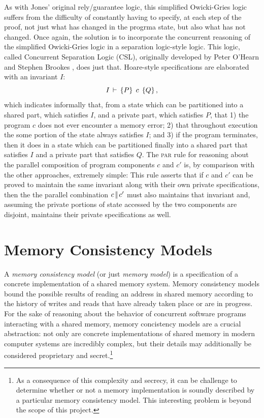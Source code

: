 \documentclass[11pt]{report}
\begin{document}
As with Jones' original rely/guarantee logic, this simplified Owicki-Gries logic suffers from the difficulty of constantly having to specify, at each step of the proof, not just what has changed in the progrma state, but also what has not changed. Once again, the solution is to incorporate the concurrent reasoning of the simplified Owicki-Gries logic in a separation logic-style logic. This logic, called Concurrent Separation Logic (CSL), originally developed by Peter O'Hearn and Stephen Brookes \cite{DBLP:journals/tcs/OHearn07,DBLP:journals/tcs/Brookes07}, does just that. Hoare-style specifications are elaborated with an invariant $I$: \[ I\,\vdash\,\left\lbrace P \right\rbrace\;c\;\left\lbrace Q \right\rbrace,\] which indicates informally that, from a state which can be partitioned into a shared part, which satisfies $I$, and a private part, which satisfies $P$, that 1) the program $c$ does not ever encounter a memory error; 2) that throughout execution the some portion of the state always satisfies $I$; and 3) if the program terminates, then it does in a state which can be partitioned finally into a shared part that satisfies $I$ and a private part that satisfies $Q$. The \textsc{par} rule for reasoning about the parallel composition of program components $c$ and $c'$ is, by comparison with the other approaches, extremely simple:  This rule asserts that if $c$ and $c'$ can be proved to maintain the same invariant along with their own private specifications, then the the parallel combination $c \operatorname{|\!|} c'$ must also maintains that invariant and, assuming the private portions of state accessed by the two components are disjoint, maintains their private specifications as well. 

\section{Memory Consistency Models}

A \emph{memory consistency model} (or just \emph{memory model}) is a specification of a concrete implementation of a shared memory system. Memory consistency models bound the possible results of reading an address in shared memory according to the history of writes and reads that have already taken place or are in progress. For the sake of reasoning about the behavior of concurrent software programs interacting with a shared memory, memory concistency models are a crucial abstraction: not only are concrete implementations of shared memory in modern computer systems are incredibly complex, but their details may additionally be considered proprietary and secret.\footnote{As a consequence of this complexity and secrecy, it can be challenge to determine whether or not a memory implementation is soundly described by a particular memory consistency model. This interesting problem is beyond the scope of this project.}  
\end{document}
